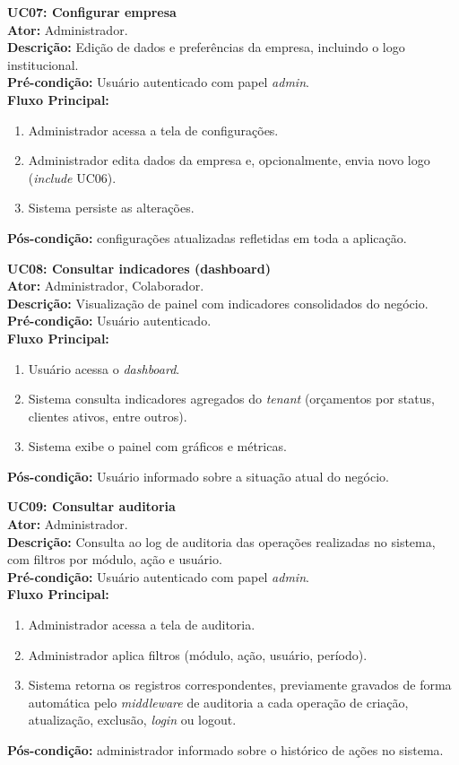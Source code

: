 \medskip
\noindent\textbf{UC07: Configurar empresa}\\
\textbf{Ator:} Administrador.\\
\textbf{Descrição:} Edição de dados e preferências da empresa, incluindo o logo institucional.\\
\textbf{Pré-condição:} Usuário autenticado com papel \textit{admin}.\\
\textbf{Fluxo Principal:}
\begin{enumerate}
  \item Administrador acessa a tela de configurações.
  \item Administrador edita dados da empresa e, opcionalmente, envia novo logo (\textit{\guillemotleft include\guillemotright} UC06).
  \item Sistema persiste as alterações.
\end{enumerate}
\textbf{Pós-condição:} configurações atualizadas refletidas em toda a aplicação.

\medskip
\noindent\textbf{UC08: Consultar indicadores (dashboard)}\\
\textbf{Ator:} Administrador, Colaborador.\\
\textbf{Descrição:} Visualização de painel com indicadores consolidados do negócio.\\
\textbf{Pré-condição:} Usuário autenticado.\\
\textbf{Fluxo Principal:}
\begin{enumerate}
  \item Usuário acessa o \textit{dashboard}.
  \item Sistema consulta indicadores agregados do \textit{tenant} (orçamentos por status, clientes ativos, entre outros).
  \item Sistema exibe o painel com gráficos e métricas.
\end{enumerate}
\textbf{Pós-condição:} Usuário informado sobre a situação atual do negócio.

\medskip
\noindent\textbf{UC09: Consultar auditoria}\\
\textbf{Ator:} Administrador.\\
\textbf{Descrição:} Consulta ao log de auditoria das operações realizadas no sistema, com filtros por módulo, ação e usuário.\\
\textbf{Pré-condição:} Usuário autenticado com papel \textit{admin}.\\
\textbf{Fluxo Principal:}
\begin{enumerate}
  \item Administrador acessa a tela de auditoria.
  \item Administrador aplica filtros (módulo, ação, usuário, período).
  \item Sistema retorna os registros correspondentes, previamente gravados de forma automática pelo \textit{middleware} de auditoria a cada operação de criação, atualização, exclusão, \textit{login} ou logout.
\end{enumerate}
\textbf{Pós-condição:} administrador informado sobre o histórico de ações no sistema.

